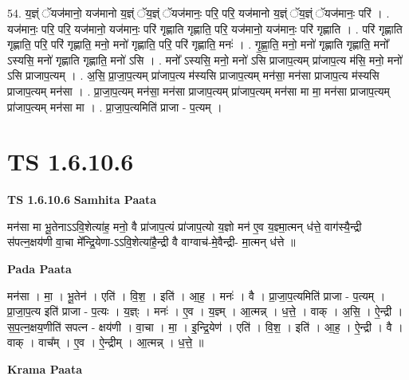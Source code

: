 \documentclass[17pt]{extarticle}
\begin{document}
54. य॒ज्ञ्ं ॅयज॑मानो॒ यज॑मानो य॒ज्ञ्ं ॅय॒ज्ञ्ं ॅयज॑मानः॒ परि॒ परि॒ यज॑मानो य॒ज्ञ्ं ॅय॒ज्ञ्ं ॅयज॑मानः॒ परि॑ । . यज॑मानः॒ परि॒ परि॒ यज॑मानो॒ यज॑मानः॒ परि॑ गृह्णाति गृह्णाति॒ परि॒ यज॑मानो॒ यज॑मानः॒ परि॑ गृह्णाति । . परि॑ गृह्णाति गृह्णाति॒ परि॒ परि॑ गृह्णाति॒ मनो॒ मनो॑ गृह्णाति॒ परि॒ परि॑ गृह्णाति॒ मनः॑ । . गृ॒ह्णा॒ति॒ मनो॒ मनो॑ गृह्णाति गृह्णाति॒ मनो᳚ ऽस्यसि॒ मनो॑ गृह्णाति गृह्णाति॒ मनो॑ ऽसि । . मनो᳚ ऽस्यसि॒ मनो॒ मनो॑ ऽसि प्राजाप॒त्यम् प्रा॑जाप॒त्य म॑सि॒ मनो॒ मनो॑ ऽसि प्राजाप॒त्यम् । . अ॒सि॒ प्रा॒जा॒प॒त्यम् प्रा॑जाप॒त्य म॑स्यसि प्राजाप॒त्यम् मन॑सा॒ मन॑सा प्राजाप॒त्य म॑स्यसि प्राजाप॒त्यम् मन॑सा । . प्रा॒जा॒प॒त्यम् मन॑सा॒ मन॑सा प्राजाप॒त्यम् प्रा॑जाप॒त्यम् मन॑सा मा मा॒ मन॑सा प्राजाप॒त्यम् प्रा॑जाप॒त्यम् मन॑सा मा । . प्रा॒जा॒प॒त्यमिति॑ प्राजा - प॒त्यम् । \newline
\pagebreak
{}

\section{ TS 1.6.10.6 }

\textbf{TS 1.6.10.6 } \newline
\textbf{Samhita Paata} \newline

मन॑सा मा भू॒तेनाऽऽवि॒शेत्या॑ह॒ मनो॒ वै प्रा॑जाप॒त्यं प्रा॑जाप॒त्यो य॒ज्ञो मन॑ ए॒व य॒ज्ञ्मा॒त्मन् ध॑त्ते॒ वाग॑स्यै॒न्द्री स॑पत्न॒क्षय॑णी वा॒चा मे᳚न्द्रि॒येणा-ऽऽवि॒शेत्या॑है॒न्द्री वै वाग्वाच॑-मे॒वैन्द्री- मा॒त्मन् ध॑त्ते ॥ \newline

\textbf{Pada Paata} \newline

मन॑सा । मा॒ । भू॒तेन॑ । एति॑ । वि॒श॒ । इति॑ । आ॒ह॒ । मनः॑ । वै । प्रा॒जा॒प॒त्यमिति॑ प्राजा - प॒त्यम् । प्रा॒जा॒प॒त्य इति॑ प्राजा - प॒त्यः । य॒ज्ञ्ः । मनः॑ । ए॒व । य॒ज्ञ्म् । आ॒त्मन्न् । ध॒त्ते॒ । वाक् । अ॒सि॒ । ऐ॒न्द्री । स॒प॒त्न॒क्षय॒णीति॑ सपत्न - क्षय॑णी । वा॒चा । मा॒ । इ॒न्द्रि॒येण॑ । एति॑ । वि॒श॒ । इति॑ । आ॒ह॒ । ऐ॒न्द्री । वै । वाक् । वाच᳚म् । ए॒व । ऐ॒न्द्रीम् । आ॒त्मन्न् । ध॒त्ते॒ ॥  \newline


\textbf{Krama Paata} \newline
\end{document}
